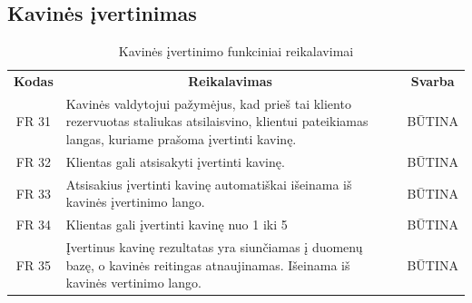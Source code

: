 \documentclass{VUMIFPSkursinis}
\begin{document}
\subsection{Kavinės įvertinimas}
\begin{center}
	\begin{table}[H]
	\caption{Kavinės įvertinimo funkciniai reikalavimai}
	\begin{tabular}{|p{2cm}|p{}|p{}|}
	
	\hline
	    \rowcolor{lightgray}
		\multicolumn{3}{|c|}{Kavinės įvertinimas}\\
		
	\hline
		\multicolumn{1}{|c|}{{\bfseries Kodas}}&
		\multicolumn{1}{|c|}{{\bfseries Reikalavimas}}&
		\multicolumn{1}{|c|}{{\bfseries Svarba}}\\

	\hline
	
		\multicolumn{1}{|c|}{FR 31}&
		{Kavinės valdytojui pažymėjus, kad prieš tai kliento rezervuotas staliukas atsilaisvino, klientui pateikiamas langas, kuriame prašoma įvertinti kavinę.}&
		\multicolumn{1}{|c|}{BŪTINA}\\				
	\hline
	
		\multicolumn{1}{|c|}{FR 32}&
		{Klientas gali atsisakyti įvertinti kavinę.}&
		\multicolumn{1}{|c|}{BŪTINA}\\				
	\hline
	
		\multicolumn{1}{|c|}{FR 33}&
		{Atsisakius įvertinti kavinę automatiškai išeinama iš kavinės įvertinimo lango.}&
		\multicolumn{1}{|c|}{BŪTINA}\\				
	\hline
	
		\multicolumn{1}{|c|}{FR 34}&
		{Klientas gali įvertinti kavinę nuo 1 iki 5}&
		\multicolumn{1}{|c|}{BŪTINA}\\				
	\hline
	
		\multicolumn{1}{|c|}{FR 35}&
		{Įvertinus kavinę rezultatas yra siunčiamas į duomenų bazę, o kavinės reitingas atnaujinamas. Išeinama iš kavinės vertinimo lango.}&
		\multicolumn{1}{|c|}{BŪTINA}\\				
	\hline	
	
	\end{tabular}		
	
	\label{table:KavinėsĮvertinimas}
	\end{table}


\end{center}
\pagebreak
\end{document}
